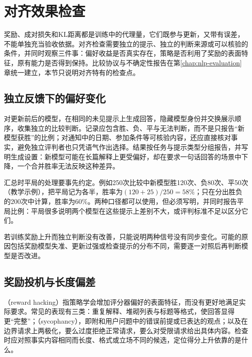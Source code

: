 \section{对齐效果检查}
\label{sec:nlp-align-checking}

奖励、成对损失和KL距离都是训练中的代理量，它们既参与更新，又带有误差，不能单独充当验收依据。对齐检查需要独立的提示、独立的判断来源或可以核验的条件，并同时观察三件事：偏好收益是否真实存在，策略是否利用了奖励的表面特征，原有能力是否得到保持。比较协议与不确定性报告在第\ref{chap:nlp-evaluation}章统一建立，本节只说明对齐特有的检查点。

\subsection{独立反馈下的偏好变化}
\label{sec:nlp-align-independent-feedback}

对更新前后的模型，在相同的未见提示上生成回答，隐藏模型身份并交换展示顺序，收集独立的比较判断。记录应包含胜、负、平与无法判断，而不是只报告“新模型获胜”的比例；对通知中的日期、参加条件等可核验内容，还应直接核对事实，避免独立评判者也只凭语气作出选择。结果按任务与提示类型分组报告，并写明生成设置：新模型可能在长篇解释上更受偏好，却在要求一句话回答的场景中下降，一个合并胜率无法反映这种差异。

汇总时平局的处理要事先约定。例如250次比较中新模型胜120次、负80次、平50次（教学示例），把平局记为各半，胜率为$(120+25)/250=58\%$；只在分出胜负的200次中计算，胜率为$60\%$。两种口径都可以使用，但必须写明，并同时报告平局比例：平局很多说明两个模型在这些提示上差别不大，或评判标准不足以区分它们。

若训练奖励上升而独立判断没有改善，只能说明两种信号没有同步变化。可能的原因包括奖励模型失准、更新过强或检查提示的分布不同，需要逐一对照后再判断模型是否改进。

\subsection{奖励投机与长度偏差}
\label{sec:nlp-align-reward-hacking}

（reward hacking）指策略学会增加评分器偏好的表面特征，而没有更好地满足实际要求。常见的表现有三类：重复解释、堆砌列表与标题等格式，使回答显得更“完整”；（sycophancy），即附和用户问题中的错误前提或已表达的观点\cite{nlp-align-sharma2024sycophancy}；以及在边界请求上两极化，要么过度拒绝正常请求，要么对受限请求给出具体内容。检查时应对照事实内容相同而长度、格式或立场不同的候选，定位得分上升依靠的是什么。

